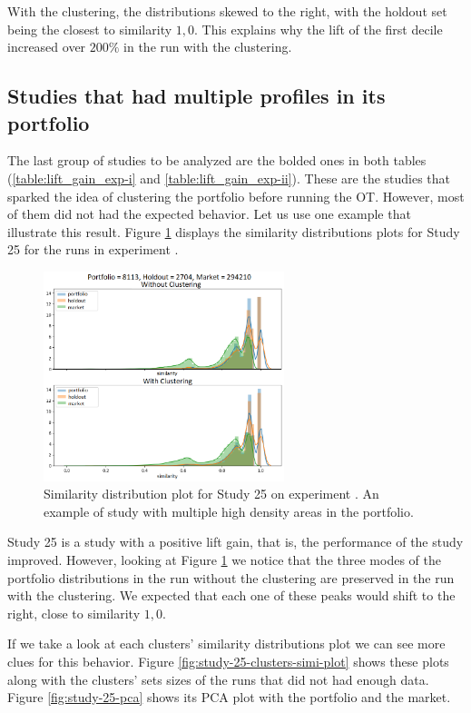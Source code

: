 With the clustering, the distributions skewed to the right, with the holdout set being the closest to similarity $1,0$. This explains why the lift of the first decile increased over $200\%$ in the run with the clustering.

\subsection{Studies that had multiple profiles in its portfolio}

The last group of studies to be analyzed are the bolded ones in both tables (\ref{table:lift_gain_exp-i} and \ref{table:lift_gain_exp-ii}). These are the studies that sparked the idea of clustering the portfolio before running the OT. However, most of them did not had the expected behavior. Let us use one example that illustrate this result. Figure \ref{fig:bump-study-25} displays the similarity distributions plots for Study 25 for the runs in experiment \nameExperimentII{}. 

\begin{figure}[H]
   \centering
   \includegraphics[width=7cm]{fig/ch4-bump-study-25.png}
   \caption{Similarity distribution plot for Study 25 on experiment \nameExperimentII{}. An example of study with multiple high density areas in the portfolio.}
   \label{fig:bump-study-25}
\end{figure}

Study 25 is a study with a positive lift gain, that is, the performance of the study improved. However, looking at Figure \ref{fig:bump-study-25} we notice that the three modes of the portfolio distributions in the run without the clustering are preserved in the run with the clustering. We expected that each one of these peaks would shift to the right, close to similarity $1,0$. 

If we take a look at each clusters' similarity distributions plot we can see more clues for this behavior. Figure \ref{fig:study-25-clusters-simi-plot} shows these plots along with the clusters' sets sizes of the runs that did not had enough data. Figure \ref{fig:study-25-pca} shows its PCA plot with the portfolio and the market. 

